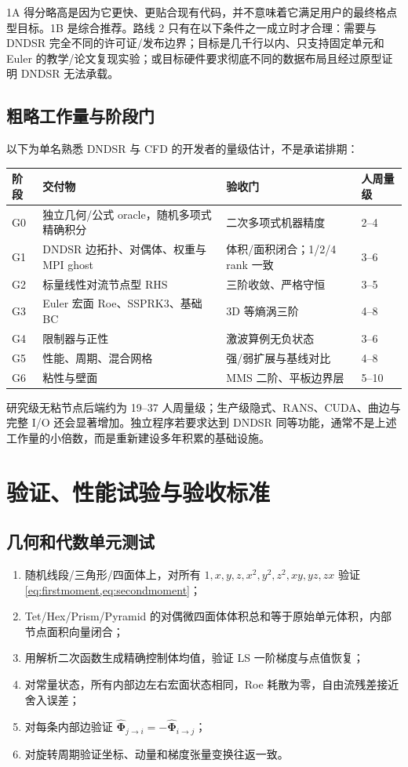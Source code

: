 \documentclass[UTF8,a4paper,11pt,openany]{ctexrep}
\numberwithin{equation}{chapter}
\begin{document}
1A 得分略高是因为它更快、更贴合现有代码，并不意味着它满足用户的最终格点型目标。1B 是综合推荐。路线 2 只有在以下条件之一成立时才合理：需要与 DNDSR 完全不同的许可证/发布边界；目标是几千行以内、只支持固定单元和 Euler 的教学/论文复现实验；或目标硬件要求彻底不同的数据布局且经过原型证明 DNDSR 无法承载。

\section{粗略工作量与阶段门}

以下为单名熟悉 DNDSR 与 CFD 的开发者的量级估计，不是承诺排期：

\begin{longtable}{p{}p{}p{}p{}}
\toprule
阶段 & 交付物 & 验收门 & 人周量级\\
\midrule
G0 & 独立几何/公式 oracle，随机多项式精确积分 & 二次多项式机器精度 & 2--4\\
G1 & DNDSR 边拓扑、对偶体、权重与 MPI ghost & 体积/面积闭合；1/2/4 rank 一致 & 3--6\\
G2 & 标量线性对流节点型 RHS & 三阶收敛、严格守恒 & 3--5\\
G3 & Euler 宏面 Roe、SSPRK3、基础 BC & 3D 等熵涡三阶 & 4--8\\
G4 & 限制器与正性 & 激波算例无负状态 & 3--6\\
G5 & 性能、周期、混合网格 & 强/弱扩展与基线对比 & 4--8\\
G6 & 粘性与壁面 & MMS 二阶、平板边界层 & 5--10\\
\bottomrule
\end{longtable}

研究级无粘节点后端约为 19--37 人周量级；生产级隐式、RANS、CUDA、曲边与完整 I/O 还会显著增加。独立程序若要求达到 DNDSR 同等功能，通常不是上述工作量的小倍数，而是重新建设多年积累的基础设施。

\chapter{验证、性能试验与验收标准}

\section{几何和代数单元测试}

\begin{enumerate}
  \item 随机线段/三角形/四面体上，对所有 $1,x,y,z,x^2,y^2,z^2,xy,yz,zx$ 验证 \cref{eq:firstmoment,eq:secondmoment}；
  \item Tet/Hex/Prism/Pyramid 的对偶微四面体体积总和等于原始单元体积，内部节点面积向量闭合；
  \item 用解析二次函数生成精确控制体均值，验证 LS 一阶梯度与点值恢复；
  \item 对常量状态，所有内部边左右宏面状态相同，Roe 耗散为零，自由流残差接近舍入误差；
  \item 对每条内部边验证 $\widehat{\bm\Phi}_{j\to i}=-\widehat{\bm\Phi}_{i\to j}$；
  \item 对旋转周期验证坐标、动量和梯度张量变换往返一致。
\end{enumerate}
\end{document}
